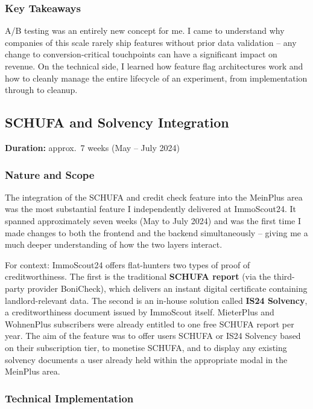 \documentclass[a4paper, 12pt]{article}
\begin{document}
\subsubsection*{Key Takeaways}

A/B testing was an entirely new concept for me. I came to understand why companies of
this scale rarely ship features without prior data validation -- any change to
conversion-critical touchpoints can have a significant impact on revenue. On the
technical side, I learned how feature flag architectures work and how to cleanly manage
the entire lifecycle of an experiment, from implementation through to cleanup.

\subsection{SCHUFA and Solvency Integration}

\noindent\textbf{Duration:} approx.\ 7 weeks (May -- July 2024)

\subsubsection*{Nature and Scope}

The integration of the SCHUFA and credit check feature into the MeinPlus area was the
most substantial feature I independently delivered at ImmoScout24. It spanned
approximately seven weeks (May to July 2024) and was the first time I made changes to
both the frontend and the backend simultaneously -- giving me a much deeper
understanding of how the two layers interact.

For context: ImmoScout24 offers flat-hunters two types of proof of creditworthiness.
The first is the traditional \textbf{SCHUFA report} (via the third-party provider
BoniCheck), which delivers an instant digital certificate containing landlord-relevant
data. The second is an in-house solution called \textbf{IS24 Solvency}, a
creditworthiness document issued by ImmoScout itself. MieterPlus and WohnenPlus
subscribers were already entitled to one free SCHUFA report per year. The aim of the
feature was to offer users SCHUFA or IS24 Solvency based on their subscription tier,
to monetise SCHUFA, and to display any existing solvency documents a user already held
within the appropriate modal in the MeinPlus area.

\subsubsection*{Technical Implementation}
\end{document}
